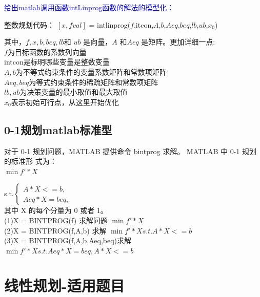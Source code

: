 \documentclass[a4paper,20pt]{article}
\begin{document}
\par \noindent \large \textcolor{blue}{给出matlab调用函数intLinprog函数的解法的模型化：}

\par \noindent 整数规划代码： $\left[  x,fval  \right]$ = intlinprog($f$,itcon,$A$,$b$,$Aeq$,$beq$,$lb$,$ub$,$x_0$)
\par 其中，$f,x,b,beq,lb$和 $ub$ 是向量，$A$ 和$ Aeq$ 是矩阵。更加详细一点:
\\$f$为目标函数的系数列向量
    \\intcon是标明哪些变量是整数变量
    \\ $A,b$为不等式约束条件的变量系数矩阵和常数项矩阵
    \\$Aeq,beq$为等式约束条件的稀疏矩阵和常数项矩阵
\\$lb,ub$为决策变量的最小取值和最大取值
    \\$x_0$表示初始可行点，从这里开始优化
\subsection{0-1规划matlab标准型}
对于 0-1 规划问题，MATLAB 提供命令 bintprog 求解。 MATLAB 中 0-1 规划的标准形
式为：
\\$\min f'*X$
    \par \noindent s.t.$\left\{\begin{matrix}
    A*X <= b, \\
    Aeq*X = beq,
\end{matrix} \right.$
    \\其中 X 的每个分量为 0 或者 1。
    \\(1)X = BINTPROG(f) 求解问题 $\min f'*X$
    \\(2)X = BINTPROG(f,A,b) 求解 $\min f'*X s.t. A*X <= b$
    \\(3)X = BINTPROG(f,A,b,Aeq,beq)求解 $\min f'*X s.t. Aeq*X = beq, A*X <= b$
    \section{线性规划-适用题目}
\end{document}

